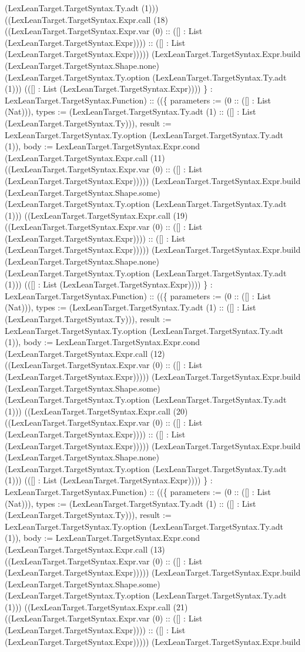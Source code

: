 \documentclass[11pt]{article}
\begin{document}
(LexLeanTarget.TargetSyntax.Ty.adt (1))) ((LexLeanTarget.TargetSyntax.Expr.call (18) ((LexLeanTarget.TargetSyntax.Expr.var (0) :: ([] : List (LexLeanTarget.TargetSyntax.Expr)))) :: ([] : List (LexLeanTarget.TargetSyntax.Expr))))) (LexLeanTarget.TargetSyntax.Expr.build (LexLeanTarget.TargetSyntax.Shape.none) (LexLeanTarget.TargetSyntax.Ty.option (LexLeanTarget.TargetSyntax.Ty.adt (1))) (([] : List (LexLeanTarget.TargetSyntax.Expr)))) \} : LexLeanTarget.TargetSyntax.Function) :: ((\{ parameters := (0 :: ([] : List (Nat))), types := (LexLeanTarget.TargetSyntax.Ty.adt (1) :: ([] : List (LexLeanTarget.TargetSyntax.Ty))), result := LexLeanTarget.TargetSyntax.Ty.option (LexLeanTarget.TargetSyntax.Ty.adt (1)), body := LexLeanTarget.TargetSyntax.Expr.cond (LexLeanTarget.TargetSyntax.Expr.call (11) ((LexLeanTarget.TargetSyntax.Expr.var (0) :: ([] : List (LexLeanTarget.TargetSyntax.Expr))))) (LexLeanTarget.TargetSyntax.Expr.build (LexLeanTarget.TargetSyntax.Shape.some) (LexLeanTarget.TargetSyntax.Ty.option (LexLeanTarget.TargetSyntax.Ty.adt (1))) ((LexLeanTarget.TargetSyntax.Expr.call (19) ((LexLeanTarget.TargetSyntax.Expr.var (0) :: ([] : List (LexLeanTarget.TargetSyntax.Expr)))) :: ([] : List (LexLeanTarget.TargetSyntax.Expr))))) (LexLeanTarget.TargetSyntax.Expr.build (LexLeanTarget.TargetSyntax.Shape.none) (LexLeanTarget.TargetSyntax.Ty.option (LexLeanTarget.TargetSyntax.Ty.adt (1))) (([] : List (LexLeanTarget.TargetSyntax.Expr)))) \} : LexLeanTarget.TargetSyntax.Function) :: ((\{ parameters := (0 :: ([] : List (Nat))), types := (LexLeanTarget.TargetSyntax.Ty.adt (1) :: ([] : List (LexLeanTarget.TargetSyntax.Ty))), result := LexLeanTarget.TargetSyntax.Ty.option (LexLeanTarget.TargetSyntax.Ty.adt (1)), body := LexLeanTarget.TargetSyntax.Expr.cond (LexLeanTarget.TargetSyntax.Expr.call (12) ((LexLeanTarget.TargetSyntax.Expr.var (0) :: ([] : List (LexLeanTarget.TargetSyntax.Expr))))) (LexLeanTarget.TargetSyntax.Expr.build (LexLeanTarget.TargetSyntax.Shape.some) (LexLeanTarget.TargetSyntax.Ty.option (LexLeanTarget.TargetSyntax.Ty.adt (1))) ((LexLeanTarget.TargetSyntax.Expr.call (20) ((LexLeanTarget.TargetSyntax.Expr.var (0) :: ([] : List (LexLeanTarget.TargetSyntax.Expr)))) :: ([] : List (LexLeanTarget.TargetSyntax.Expr))))) (LexLeanTarget.TargetSyntax.Expr.build (LexLeanTarget.TargetSyntax.Shape.none) (LexLeanTarget.TargetSyntax.Ty.option (LexLeanTarget.TargetSyntax.Ty.adt (1))) (([] : List (LexLeanTarget.TargetSyntax.Expr)))) \} : LexLeanTarget.TargetSyntax.Function) :: ((\{ parameters := (0 :: ([] : List (Nat))), types := (LexLeanTarget.TargetSyntax.Ty.adt (1) :: ([] : List (LexLeanTarget.TargetSyntax.Ty))), result := LexLeanTarget.TargetSyntax.Ty.option (LexLeanTarget.TargetSyntax.Ty.adt (1)), body := LexLeanTarget.TargetSyntax.Expr.cond (LexLeanTarget.TargetSyntax.Expr.call (13) ((LexLeanTarget.TargetSyntax.Expr.var (0) :: ([] : List (LexLeanTarget.TargetSyntax.Expr))))) (LexLeanTarget.TargetSyntax.Expr.build (LexLeanTarget.TargetSyntax.Shape.some) (LexLeanTarget.TargetSyntax.Ty.option (LexLeanTarget.TargetSyntax.Ty.adt (1))) ((LexLeanTarget.TargetSyntax.Expr.call (21) ((LexLeanTarget.TargetSyntax.Expr.var (0) :: ([] : List (LexLeanTarget.TargetSyntax.Expr)))) :: ([] : List (LexLeanTarget.TargetSyntax.Expr))))) (LexLeanTarget.TargetSyntax.Expr.build 
\end{document}
